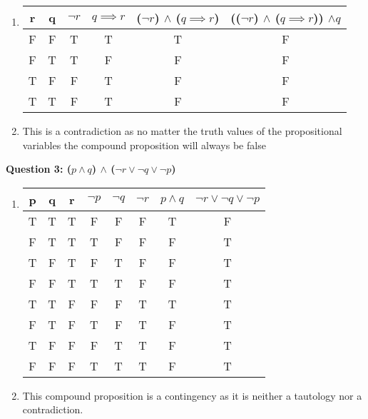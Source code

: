 \documentclass[11pt]{article}
\begin{document}
\begin{enumerate}
\begin{enumerate}[label=(\alph*)]
\item
\begin{center}
\begin{tabular}{ |c|c|c|c|c|c| }
 \hline
 r & q & $\neg r$ & $q \implies r$ & ($\neg r$) $\land$ ($q \implies r$) & (($\neg r$) $\land$ ($q \implies r$)) $\land q$ \\
 \hline
 F & F & T & T & T & F \\
 F & T & T & F & F & F \\
 T & F & F & T & F & F \\
 T & T & F & T & F & F \\
 \hline

\end{tabular}
\end{center}
\item 
This is a contradiction as no matter the truth values of the propositional variables the compound proposition will always be false

\end{enumerate}

\textbf{Question 3: ($ p \land q$) $\land $ ($\neg r \lor \neg q \lor \neg p$)}

\begin{enumerate}[label=(\alph*)]
\item
\begin{center}
\begin{tabular}{ |c|c|c|c|c|c|c|c| }
 \hline
 p & q & r & $\neg p$ & $\neg q$ & $\neg r$ & $ p \land q$ & $\neg r \lor \neg q \lor \neg p$ \\
 \hline
 T & T & T & F & F & F & T & F \\
 F & T & T & T & F & F & F & T \\
 T & F & T & F & T & F & F & T \\
 F & F & T & T & T & F & F & T \\
 T & T & F & F & F & T & T & T \\
 F & T & F & T & F & T & F & T \\
 T & F & F & F & T & T & F & T \\
 F & F & F & T & T & T & F & T \\
 \hline

\end{tabular}
\end{center}
\item 
This compound proposition is a contingency as it is neither a tautology nor a contradiction.


\end{enumerate}
\end{enumerate}
\end{document}
